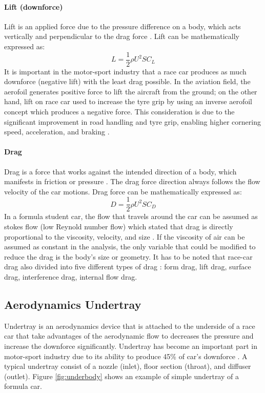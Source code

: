 \paragraph{Lift (downforce)}
Lift is an applied force due to the pressure difference on a body, which acts vertically and perpendicular to the drag force \cite{Scibor-Rylski1984RoadAerodynamics}. Lift can be mathematically expressed as:
\begin{equation}
    L = \frac{1}{2}\rho U^2 S C_L
\end{equation}
It is important in the motor-sport industry that a race car produces as much downforce (negative lift) with the least drag possible. In the aviation field, the aerofoil generates positive force to lift the aircraft from the ground; on the other hand, lift on race car used to increase the tyre grip by using an inverse aerofoil concept which produces a negative force. This consideration is due to the significant improvement in road handling and tyre grip, enabling higher cornering speed, acceleration, and braking \cite{Barnard1997RoadIntroduction}.


\paragraph{Drag}
Drag is a force that works against the intended direction of a body, which manifests in friction or pressure \cite{Obidi2014TheoryVehicles}. The drag force direction always follows the flow velocity of the car motions. Drag force can be mathematically expressed as:
\begin{equation}
    D = \frac{1}{2}\rho U^2 S C_D
\end{equation}
In a formula student car, the flow that travels around the car can be assumed as stokes flow (low Reynold number flow) which stated that drag is directly proportional to the viscosity, velocity, and size \cite{Obidi2014TheoryVehicles}. If the viscosity of air can be assumed as constant in the analysis, the only variable that could be modified to reduce the drag is the body's size or geometry. It has to be noted that race-car drag also divided into five different types of drag \cite{Kelly1964AerodynamicsEngineers}: form drag, lift drag, surface drag, interference drag, internal flow drag.

\subsection{Aerodynamics Undertray}
Undertray is an aerodynamics device that is attached to the underside of a race car that take advantages of the aerodynamic flow to decreases the pressure and increase the downforce significantly. Undertray has become an important part in motor-sport industry due to its ability to produce 45\% of car's downforce \cite{Katz1995RaceSpeed}. A typical undertray consist of a nozzle (inlet), floor section (throat), and diffuser (outlet).  Figure \ref{fig:underbody} shows an example of simple undertray of a formula car.

